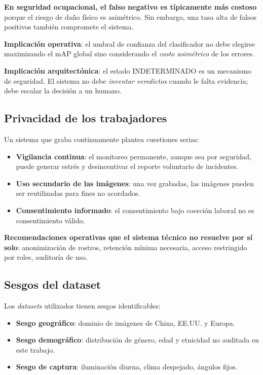 \documentclass[journal,onecolumn,11pt]{IEEEtran}
\begin{document}
\textbf{En seguridad ocupacional, el falso negativo es típicamente
más costoso} porque el riesgo de daño físico es asimétrico. Sin
embargo, una tasa alta de falsos positivos también compromete el
sistema.

\textbf{Implicación operativa}: el umbral de confianza del
clasificador no debe elegirse maximizando el mAP global sino
considerando el \emph{costo asimétrico} de los errores.

\textbf{Implicación arquitectónica}: el estado INDETERMINADO es un
mecanismo de seguridad. El sistema no debe \emph{inventar
veredictos} cuando le falta evidencia; debe escalar la decisión a
un humano.

\subsection{Privacidad de los trabajadores}

Un sistema que graba continuamente plantea cuestiones serias:

\begin{itemize}[leftmargin=*]
    \item \textbf{Vigilancia continua}: el monitoreo permanente,
    aunque sea por seguridad, puede generar estrés y desincentivar
    el reporte voluntario de incidentes.
    \item \textbf{Uso secundario de las imágenes}: una vez grabadas,
    las imágenes pueden ser reutilizadas para fines no acordados.
    \item \textbf{Consentimiento informado}: el consentimiento bajo
    coerción laboral no es consentimiento válido.
\end{itemize}

\textbf{Recomendaciones operativas que el sistema técnico no
resuelve por sí solo}: anonimización de rostros, retención mínima
necesaria, acceso restringido por roles, auditoría de uso.

\subsection{Sesgos del dataset}

Los \textit{datasets} utilizados tienen sesgos identificables:

\begin{itemize}[leftmargin=*]
    \item \textbf{Sesgo geográfico}: dominio de imágenes de China,
    EE.UU. y Europa.
    \item \textbf{Sesgo demográfico}: distribución de género, edad y
    etnicidad no auditada en este trabajo.
    \item \textbf{Sesgo de captura}: iluminación diurna, clima
    despejado, ángulos fijos.
\end{itemize}
\end{document}
